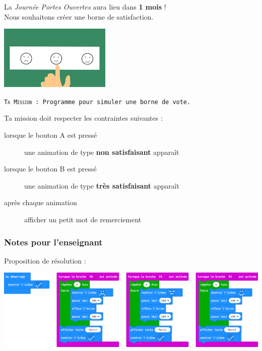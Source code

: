 \begin{eleve}
    La \textit{Journée Portes Ouvertes} aura lieu dans \textbf{1 mois} !\\
    Nous souhaitons créer une borne de satisfaction.
    \begin{center}
        \includegraphics[width=0.35\linewidth]{res/vote.png}
    \end{center}
    
    \vspace{1em}
    \texttt{\textsc{Ta Mission} : Programme \mb pour simuler une borne de vote.}
    \vspace{1em}
    
    Ta mission doit respecter les contraintes suivantes :
    \begin{description}
        \item[lorsque le bouton A est pressé] une animation de type \textbf{non satisfaisant} apparaît
        \item[lorsque le bouton B est pressé] une animation de type \textbf{très satisfaisant} apparaît
        \item[après chaque animation] afficher un petit mot de remerciement
    \end{description}
\end{eleve}

\newpage

\subsubsection{Notes pour l'enseignant}

%
%
\begin{methode}
Proposition de résolution :

\includegraphics[width=\linewidth]{res/mb-jpo-code01.png}
\end{methode}


